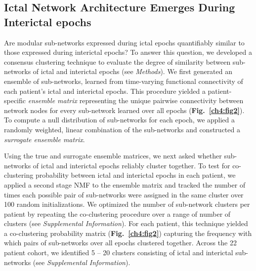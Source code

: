 \subsection{Ictal Network Architecture Emerges During Interictal epochs}
Are modular sub-networks expressed during ictal epochs quantifiably similar to those expressed during interictal epochs? To answer this question, we developed a consensus clustering technique to evaluate the degree of similarity between sub-networks of ictal and interictal epochs (see \textit{Methods}). We first generated an ensemble of sub-networks, learned from time-varying functional connectivity of each patient's ictal and interictal epochs. This procedure yielded a patient-specific \textit{ensemble matrix} representing the unique pairwise connectivity between network nodes for every sub-network learned over all epochs (\textbf{Fig.~\ref{ch4:fig2}}). To compute a null distribution of sub-networks for each epoch, we applied a randomly weighted, linear combination of the sub-networks and constructed a \textit{surrogate ensemble matrix}.

Using the true and surrogate ensemble matrices, we next asked whether sub-networks of ictal and interictal epochs reliably cluster together. To test for co-clustering probability between ictal and interictal epochs in each patient, we applied a second stage NMF to the ensemble matrix and tracked the number of times each possible pair of sub-networks were assigned in the same cluster over 100 random initializations. We optimized the number of sub-network clusters per patient by repeating the co-clustering procedure over a range of number of clusters (see \textit{Supplemental Information}). For each patient, this technique yielded a co-clustering probability matrix (\textbf{Fig.~\ref{ch4:fig2}}) capturing the frequency with which pairs of sub-networks over all epochs clustered together. Across the 22 patient cohort, we identified 5 -- 20 clusters consisting of ictal and interictal sub-networks (see \textit{Supplemental Information}). 

